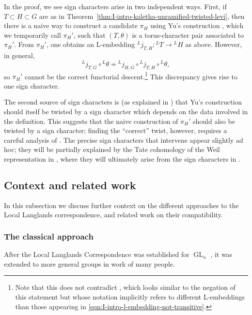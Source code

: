 \documentclass[reqno]{amsart}
\numberwithin{equation}{subsection}
\newcommand{\co}{\colon}
\newcommand{\ld}{{}^L}
\DeclareMathOperator{\GL}{GL}
\theoremstyle{remark}
\numberwithin{equation}{subsection}
\numberwithin{figure}{subsection}
\begin{document}
In the proof, we see sign characters arise in two independent ways. First, if $T \subset H \subset G$ are as in Theorem~\ref{thm:I-intro-kaletha-unramified-twisted-levi}, then there is a naive way to construct a candidate $\pi_H$ using Yu's construction \cite{Yu01}, which we temporarily call $\pi_H'$, such that $(T, \theta)$ is a torus-character pair associated to $\pi_H'$. From $\pi_H'$, one obtains an L-embedding $\ld j_{T,H}\co \ld T \to \ld H$ as above. However, in general,
\begin{equation}\label{eqn:I-intro-l-embedding-not-transitive}
\ld j_{T,G} \circ \ld\theta \not\sim \ld j_{H,G} \circ \ld j_{T,H} \circ \ld\theta,
\end{equation}
so $\pi_H'$ cannot be the correct functorial descent.\footnote{Note that this does not contradict \cite[Proposition 6.9]{Kal21a}, which looks similar to the negation of this statement but whose notation implicitly refers to different L-embeddings than those appearing in \eqref{eqn:I-intro-l-embedding-not-transitive}.} This discrepancy gives rise to one sign character. 

The second source of sign characters is (as explained in \cite{FKS23}) that Yu's construction should itself be twisted by a sign character which depends on the data involved in the definition. This suggests that the naive construction of $\pi_H'$ should also be twisted by a sign character; finding the ``correct'' twist, however, requires a careful analysis of \cite{FKS23}. The precise sign characters that intervene appear slightly ad hoc; they will be partially explained by the Tate cohomology of the Weil representation in \cite{CF26b}, where they will ultimately arise from the sign characters in \cite{Ger77}.


\subsection{Context and related work}\label{ssec:related-work}
In this subsection we discuss further context on the different approaches to the Local Langlands correspondence, and related work on their compatibility. 


\subsubsection{The classical approach}
After the Local Langlands Correspondence was established for $\GL_n$ \cite{LRS93, HT01,Hen00}, it was extended to more general groups in work of many people.
\end{document}
